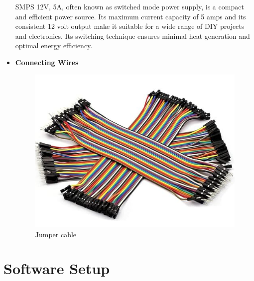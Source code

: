 \documentclass[12pt,a4paper]{report}
\begin{document}
\begin{itemize}
SMPS 12V, 5A, often known as switched mode power supply, is a compact and efficient power source. Its maximum current capacity of 5 amps and its consistent 12 volt output make it suitable for a wide range of DIY projects and electronics. Its switching technique ensures minimal heat generation and optimal energy efficiency.


\item {\bf{Connecting Wires}}
\begin{figure}[H]
\begin{center}
\includegraphics[scale=0.5]{images/hardware/jumper cable.png}
\caption{Jumper cable}
\end{center}
\end{figure}


\end{itemize}

\newpage

\section {Software Setup}
\end{document}
